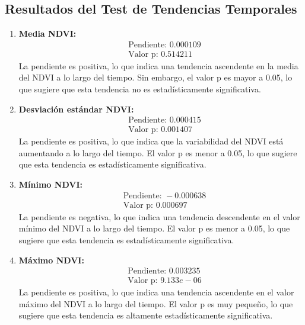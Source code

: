 \newpage
\subsection{\textbf{Resultados del Test de Tendencias Temporales}}
{\small

\begin{enumerate}
    \item \textbf{Media NDVI:}
    \begin{align*}
        &\text{Pendiente: } 0.000109 \\
        &\text{Valor p: } 0.514211
    \end{align*}
    La pendiente es positiva, lo que indica una tendencia ascendente en la media del NDVI a lo largo del tiempo. Sin embargo, el valor p es mayor a 0.05, lo que sugiere que esta tendencia no es estadísticamente significativa.

    \item \textbf{Desviación estándar NDVI:}
    \begin{align*}
        &\text{Pendiente: } 0.000415 \\
        &\text{Valor p: } 0.001407
    \end{align*}
    La pendiente es positiva, lo que indica que la variabilidad del NDVI está aumentando a lo largo del tiempo. El valor p es menor a 0.05, lo que sugiere que esta tendencia es estadísticamente significativa.\\

    \item \textbf{Mínimo NDVI:}
    \begin{align*}
        &\text{Pendiente: } -0.000638 \\
        &\text{Valor p: } 0.000697
    \end{align*}
    La pendiente es negativa, lo que indica una tendencia descendente en el valor mínimo del NDVI a lo largo del tiempo. El valor p es menor a 0.05, lo que sugiere que esta tendencia es estadísticamente significativa.\\
    
    \item \textbf{Máximo NDVI:}
    \begin{align*}
        &\text{Pendiente: } 0.003235 \\
        &\text{Valor p: } 9.133e-06
    \end{align*}
    La pendiente es positiva, lo que indica una tendencia ascendente en el valor máximo del NDVI a lo largo del tiempo. El valor p es muy pequeño, lo que sugiere que esta tendencia es altamente estadísticamente significativa.\\


\end{enumerate}}
